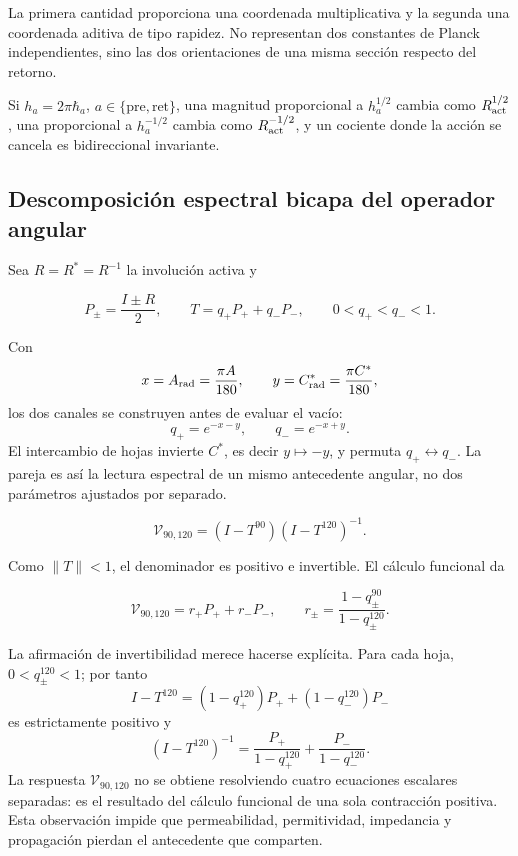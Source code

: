 La primera cantidad proporciona una coordenada multiplicativa y la segunda
una coordenada aditiva de tipo rapidez. No representan dos constantes de
Planck independientes, sino las dos orientaciones de una misma secci\'on
respecto del retorno.

Si \(h_a=2\pi\hbar_a\), \(a\in\{\mathrm{pre},\mathrm{ret}\}\), una magnitud proporcional a \(h_a^{1/2}\) cambia como \(R_{\rm act}^{1/2}\), una proporcional a \(h_a^{-1/2}\) cambia como \(R_{\rm act}^{-1/2}\), y un cociente donde la acci\'on se cancela es bidireccional invariante.

\subsection{Descomposici\'on espectral bicapa del operador angular}

Sea \(R=R^*=R^{-1}\) la involuci\'on activa y

\[
P_\pm=\frac{I\pm R}{2},
\qquad
T=q_+P_+ +q_-P_-,
\qquad 0<q_+<q_-<1.
\]

Con
\[
x=A_{\rm rad}=\frac{\pi A}{180},\qquad
y=C^*_{\rm rad}=\frac{\pi C^*}{180},
\]
los dos canales se construyen antes de evaluar el vac\'io:
\begin{equation}
q_+=e^{-x-y},\qquad q_-=e^{-x+y}.
\label{rm:eq:vacuum-angular-channels}
\end{equation}
El intercambio de hojas invierte \(C^*\), es decir \(y\mapsto-y\), y permuta \(q_+\leftrightarrow q_-\). La pareja es as\'i la lectura espectral de un mismo antecedente angular, no dos par\'ametros ajustados por separado.

\begin{definition}
\begin{equation}
\mathcal V_{90,120}=(I-T^{90})(I-T^{120})^{-1}.
\label{rm:eq:vacuum-operator}
\end{equation}
\end{definition}

Como \(\|T\|<1\), el denominador es positivo e invertible. El c\'alculo funcional da

\begin{equation}
\mathcal V_{90,120}=r_+P_+ +r_-P_-,
\qquad
r_\pm=\frac{1-q_\pm^{90}}{1-q_\pm^{120}}.
\label{rm:eq:vacuum-eigenvalues}
\end{equation}

La afirmaci\'on de invertibilidad merece hacerse expl\'icita. Para cada hoja,
\(0<q_\pm^{120}<1\); por tanto
\[
I-T^{120}=(1-q_+^{120})P_++(1-q_-^{120})P_-
\]
es estrictamente positivo y
\[
(I-T^{120})^{-1}
=\frac{P_+}{1-q_+^{120}}+
 \frac{P_-}{1-q_-^{120}}.
\]
La respuesta \(\mathcal V_{90,120}\) no se obtiene resolviendo cuatro
ecuaciones escalares separadas: es el resultado del c\'alculo funcional de una
sola contracci\'on positiva. Esta observaci\'on impide que permeabilidad,
permitividad, impedancia y propagaci\'on pierdan el antecedente que comparten.


